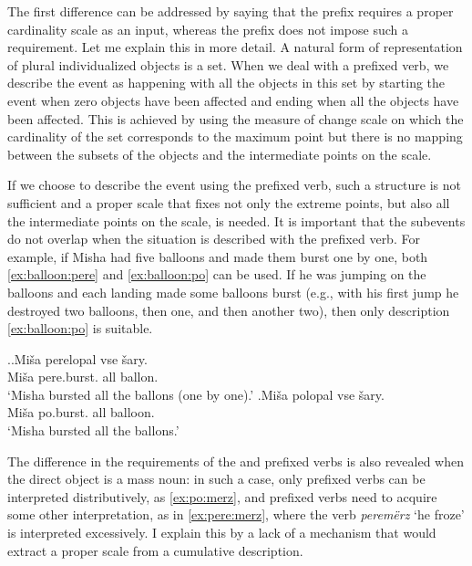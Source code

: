The first difference can be addressed by saying that the prefix  requires a proper cardinality scale as an input, whereas the prefix  does not impose such a requirement. Let me explain this in more detail. A natural form of representation of plural individualized objects is a set. When we deal with a prefixed verb, we describe the event as happening with all the objects in this set by starting the event when zero objects have been affected and ending when all the objects have been affected. This is achieved by using the measure of change scale on which the cardinality of the set corresponds to the maximum point but there is no mapping between the subsets of the objects and the intermediate points on the scale.

If we choose to describe the event using the prefixed verb, such a structure is not sufficient and a proper scale that fixes not only the extreme points, but also all the intermediate points on the scale, is needed. It is important that the subevents do not overlap when the situation is described with the prefixed verb. For example, if Misha had five balloons and made them burst one by one, both \ref{ex:balloon:pere} and \ref{ex:balloon:po} can be used. If he was jumping on the balloons and each landing made some balloons burst (e.g., with his first jump he destroyed two balloons, then one, and then another two), then only description \ref{ex:balloon:po} is suitable.

\ex.\ag.\label{ex:balloon:pere}Mi\v{s}a perelopal vse \v{s}ary.\\
Mi\v{s}a pere.burst. all ballon.\\
\trans `Misha bursted all the ballons (one by one).'
\bg.\label{ex:balloon:po}Mi\v{s}a polopal vse \v{s}ary.\\
Mi\v{s}a po.burst. all balloon.\\
\trans `Misha bursted all the ballons.'

The difference in the requirements of the  and prefixed verbs is also revealed when the direct object is a mass noun: in such a case, only prefixed verbs can be interpreted distributively, as \ref{ex:po:merz}, and prefixed verbs need to acquire some other interpretation, as in \ref{ex:pere:merz}, where the verb \textit{perem\"{e}rz} `he froze' is interpreted excessively. I explain this by a lack of a mechanism that would extract a proper scale from a cumulative description.

